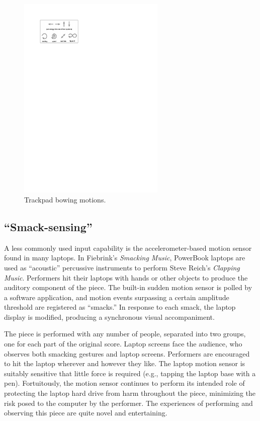 \begin{figure}[t]
\begin{center}
\includegraphics[width=70mm]{img-3-eps-converted-to.pdf}
\caption{Trackpad bowing motions.}
\label{fiebrink:fig:3} 
\end{center}
\end{figure}

\subsection{``Smack-sensing''}
A less commonly used input capability is the accelerometer-based motion sensor
found in many laptops. In Fiebrink's \textit{Smacking Music}, PowerBook laptops
are used as ``acoustic'' percussive instruments to perform Steve Reich's
\textit{Clapping Music}. Performers hit their laptops with hands or other objects
to produce the auditory component of the piece. The built-in sudden motion sensor
is polled by a software application, and motion events surpassing a certain
amplitude threshold are registered as ``smacks.'' In response to each smack, the
laptop display is modified, producing a synchronous visual accompaniment.

The piece is performed with any number of people, separated into two groups, one
for each part of the original score. Laptop screens face the audience, who
observes both smacking gestures and laptop screens. Performers are encouraged to
hit the laptop wherever and however they like. The laptop motion sensor is
suitably sensitive that little force is required (e.g., tapping the laptop base
with a pen). Fortuitously, the motion sensor continues to perform its intended
role of protecting the laptop hard drive from harm throughout the piece,
minimizing the risk posed to the computer by the performer. The experiences of
performing and observing this piece are quite novel and entertaining.

